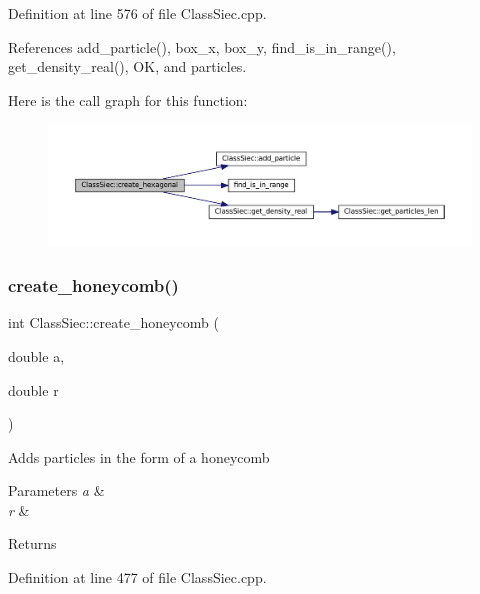 Definition at line 576 of file Class\+Siec.\+cpp.



References add\+\_\+particle(), box\+\_\+x, box\+\_\+y, find\+\_\+is\+\_\+in\+\_\+range(), get\+\_\+density\+\_\+real(), OK, and particles.

Here is the call graph for this function\+:\nopagebreak
\begin{figure}[H]
\begin{center}
\leavevmode
\includegraphics[width=350pt]{classClassSiec_a89393fb8f724ede8d628e46018e692a3_cgraph}
\end{center}
\end{figure}
\mbox{\label{classClassSiec_a67d2e9b6ac5a7031d153336071fe0b1a}} 
\subsubsection{\texorpdfstring{create\+\_\+honeycomb()}{create\_honeycomb()}\hspace{0.1cm}{\footnotesize\ttfamily [1/2]}}
{\footnotesize\ttfamily int Class\+Siec\+::create\+\_\+honeycomb (\begin{DoxyParamCaption}\item[{double}]{a,  }\item[{double}]{r }\end{DoxyParamCaption})}

Adds particles in the form of a honeycomb 
\begin{DoxyParams}{Parameters}
{\em a} & \\
\hline
{\em r} & \\
\hline
\end{DoxyParams}
\begin{DoxyReturn}{Returns}

\end{DoxyReturn}


Definition at line 477 of file Class\+Siec.\+cpp.



